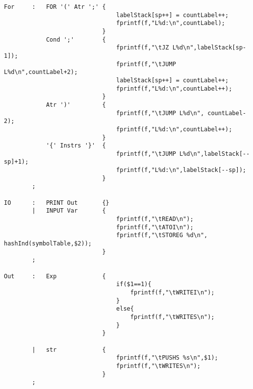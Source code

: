 \documentclass{report}
\begin{document}
\begin{verbatim}
For     :   FOR '(' Atr ';' {
                                labelStack[sp++] = countLabel++;
                                fprintf(f,"L%d:\n",countLabel);
                            }
            Cond ';'        {
                                fprintf(f,"\tJZ L%d\n",labelStack[sp-1]);
                                fprintf(f,"\tJUMP L%d\n",countLabel+2);
                                labelStack[sp++] = countLabel++;
                                fprintf(f,"L%d:\n",countLabel++);
                            }
            Atr ')'         {
                                fprintf(f,"\tJUMP L%d\n", countLabel-2);
                                fprintf(f,"L%d:\n",countLabel++);
                            }
            '{' Instrs '}'  {
                                fprintf(f,"\tJUMP L%d\n",labelStack[--sp]+1);
                                fprintf(f,"L%d:\n",labelStack[--sp]);
                            }
        ;

IO      :   PRINT Out       {}
        |   INPUT Var       {
                                fprintf(f,"\tREAD\n");
                                fprintf(f,"\tATOI\n");
                                fprintf(f,"\tSTOREG %d\n", hashInd(symbolTable,$2));
                            }
        ;

Out     :   Exp             {
                                if($1==1){
                                    fprintf(f,"\tWRITEI\n");
                                }
                                else{
                                    fprintf(f,"\tWRITES\n");
                                }
                            }

        |   str             {
                                fprintf(f,"\tPUSHS %s\n",$1);
                                fprintf(f,"\tWRITES\n");
                            }
        ;


\end{verbatim}
\end{document}
